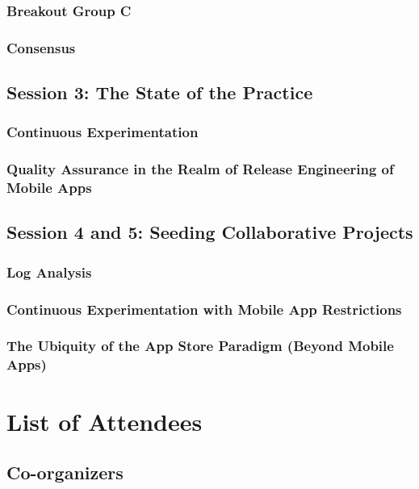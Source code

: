 \documentclass[a4paper]{article}
\begin{document}
\subsubsection{Breakout Group C}

\subsubsection{Consensus}

\subsection{Session 3: The State of the Practice}

\subsubsection{Continuous Experimentation}

\subsubsection{Quality Assurance in the Realm of Release Engineering of Mobile Apps}

\subsection{Session 4 and 5: Seeding Collaborative Projects}

\subsubsection{Log Analysis}

\subsubsection{Continuous Experimentation with Mobile App Restrictions}

\subsubsection{The Ubiquity of the App Store Paradigm (Beyond Mobile Apps)}

\clearpage

\section{List of Attendees}

\subsection{Co-organizers}
\end{document}

